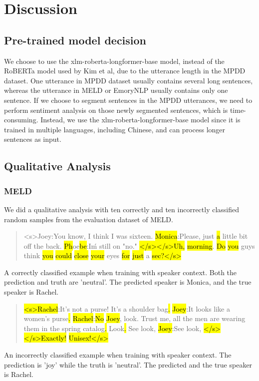 \documentclass[11pt]{article}
\begin{document}
\section{Discussion}

\subsection{Pre-trained model decision}

We choose to use the xlm-roberta-longformer-base model, instead of the RoBERTa model used by Kim et al, due to the utterance length in the MPDD dataset. One utterance in MPDD dataset usually contains several long sentences, whereas the utterance in MELD or EmoryNLP usually contains only one sentence. If we choose to segment sentences in the MPDD utterances, we need to perform sentiment analysis on those newly segmented sentences, which is time-consuming. Instead, we use the xlm-roberta-longformer-base model since it is trained in multiple languages, including Chinese, and can process longer sentences as input.

\subsection{Qualitative Analysis}

\subsubsection{MELD}

We did a qualitative analysis with ten correctly and ten incorrectly classified random samples from the evaluation dataset of MELD.

{\small
\begin{quote}

<s>Joey:You know, I think I was sixteen. \hl{Monica}:Please, just \hl{a} little bit off the back. \hl{Ph}oe\hl{be}:I\'m still on "no." \hl{</s></s>Uh,} \hl{morning}. \hl{Do} \hl{you} guys think \hl{you} \hl{could} \hl{close} \hl{your} eyes \hl{for} \hl{just} a \hl{sec}\hl{?</s>}

\end{quote}

A correctly classified example when training with speaker context. Both the prediction and truth are 'neutral'. The predicted speaker is Monica, and the true speaker is Rachel.

\begin{quote}

\hl{<s>}\hl{Rachel}:It's not a purse! It's a shoulder bag\hl{.} \hl{Joey}:It looks like a women's purse\hl{.} \hl{Rachel}:\hl{No} \hl{Joey}, look. Trust me, all the men are wearing them in the spring catalog\hl{.} Look\hl{.} See look, \hl{Joey}:See look, \hl{</s></s>Exactly!} \hl{Unisex!</s>}

\end{quote}

An incorrectly classified example when training with speaker context. The prediction is 'joy' while the truth is 'neutral'. The predicted and the true speaker is Rachel.}
\end{document}
